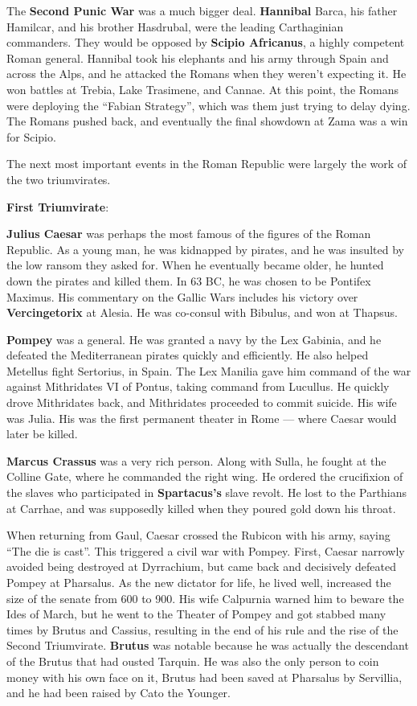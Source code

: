 The \textbf{Second Punic War} was a much bigger deal.
\textbf{Hannibal} Barca, his father Hamilcar, and his brother Hasdrubal, were the leading Carthaginian commanders.
They would be opposed by \textbf{Scipio Africanus}, a highly competent Roman general.
Hannibal took his elephants and his army through Spain and across the Alps,
and he attacked the Romans when they weren't expecting it.
He won battles at Trebia, Lake Trasimene, and Cannae.
At this point, the Romans were deploying the ``Fabian Strategy'', which was them just trying to delay dying.
The Romans pushed back, and eventually the final showdown at Zama was a win for Scipio.

The next most important events in the Roman Republic were largely the work of the two triumvirates.

\textbf{First Triumvirate}:

\textbf{Julius Caesar} was perhaps the most famous of the figures of the Roman Republic.
As a young man, he was kidnapped by pirates, and he was insulted by the low ransom they asked for.
When he eventually became older, he hunted down the pirates and killed them.
In 63 BC, he was chosen to be Pontifex Maximus.
His commentary on the Gallic Wars includes his victory over \textbf{Vercingetorix} at Alesia.
He was co-consul with Bibulus, and won at Thapsus.

\textbf{Pompey} was a general. He was granted a navy by the Lex Gabinia, and he defeated
the Mediterranean pirates quickly and efficiently.
He also helped Metellus fight Sertorius, in Spain.
The Lex Manilia gave him command of the war against Mithridates VI of Pontus, taking command from Lucullus.
He quickly drove Mithridates back, and Mithridates proceeded to commit suicide.
His wife was Julia.
His was the first permanent theater in Rome --- where Caesar would later be killed.

\textbf{Marcus Crassus} was a very rich person.
Along with Sulla, he fought at the Colline Gate, where he commanded the right wing.
He ordered the crucifixion of the slaves who participated in \textbf{Spartacus's} slave revolt.
He lost to the Parthians at Carrhae, and was supposedly killed when they poured gold down his throat.

When returning from Gaul, Caesar crossed the Rubicon with his army, saying ``The die is cast''.
This triggered a civil war with Pompey.
First, Caesar narrowly avoided being destroyed at Dyrrachium,
but came back and decisively defeated Pompey at Pharsalus.
As the new dictator for life, he lived well, increased the size of the senate from 600 to 900.
His wife Calpurnia warned him to beware the Ides of March, but he went to the Theater of Pompey and
got stabbed many times by Brutus and Cassius, resulting in the end of his rule and the
rise of the Second Triumvirate.
\textbf{Brutus} was notable because he was actually the descendant of the Brutus that had ousted Tarquin.
He was also the only person to coin money with his own face on it, Brutus had been saved at Pharsalus
by Servillia, and he had been raised by Cato the Younger.

